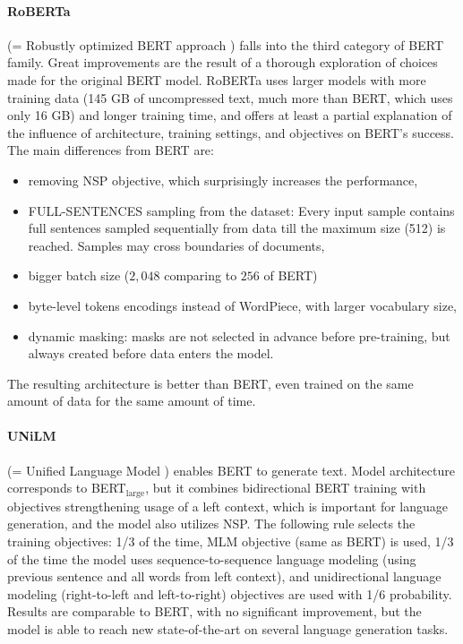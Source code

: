 \paragraph{RoBERTa} (= Robustly optimized BERT approach \citep{Liu2019}) falls into the third category of BERT family. Great improvements are the result of a thorough exploration of choices made for the original BERT model. RoBERTa uses larger models with more training data (145 GB of uncompressed text, much more than BERT, which uses only 16 GB) and longer training time, and offers at least a partial explanation of the influence of architecture, training settings, and objectives on BERT's success. The main differences from BERT are:
\begin{itemize}
\item removing NSP objective, which surprisingly increases the performance,
\item FULL-SENTENCES sampling from the dataset: Every input sample contains full sentences sampled sequentially from data till the maximum size (512) is reached.  Samples may cross boundaries of documents,
\item bigger batch size ($2,048$ comparing to $256$ of BERT)
\item byte-level tokens encodings instead of WordPiece, with larger vocabulary size,
\item dynamic masking: masks are not selected in advance before pre-training, but always created before data enters the model.
\end{itemize}
The resulting architecture is better than BERT, even trained on the same amount of data for the same amount of time.
\paragraph{UNiLM} (= Unified Language Model \citep{Dong2019}) enables BERT to generate text. Model architecture corresponds to BERT$_\textrm{large}$, but it combines bidirectional BERT training with objectives strengthening usage of a left context, which is important for language generation, and the model also utilizes NSP. The following rule selects the training objectives: 1/3 of the time, MLM objective (same as BERT) is used, 1/3 of the time the model uses sequence-to-sequence language modeling (using previous sentence and all words from left context), and unidirectional language modeling (right-to-left and left-to-right) objectives are used with 1/6 probability. Results are comparable to BERT, with no significant improvement, but the model is able to reach new state-of-the-art on several language generation tasks.
